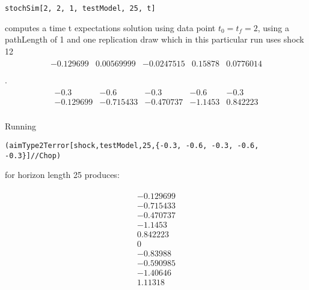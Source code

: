 \begin{verbatim}
stochSim[2, 2, 1, testModel, 25, t]
\end{verbatim}
computes a time t expectations solution  using data point $t_0=t_f=2$, using a pathLength of 1 and one replication draw 
which in this particular run uses
shock {12}
\begin{gather*}\begin{array}{ccccc}
 -0.129699 & 0.00569999 & -0.0247515 & 0.15878 & 0.0776014 \\
\end{array}
\end{gather*}
.
\begin{gather*}\begin{array}{ccccc}
 -0.3 & -0.6 & -0.3 & -0.6 & -0.3 \\
 -0.129699 & -0.715433 & -0.470737 & -1.1453 & 0.842223 \\
\end{array}
\end{gather*}







Running 
\begin{verbatim}
(aimType2Terror[shock,testModel,25,{-0.3, -0.6, -0.3, -0.6, -0.3}]//Chop)
\end{verbatim}
for horizon length 25 produces:





{\small
\begin{gather*}\begin{array}{c}
 -0.129699 \\
 -0.715433 \\
 -0.470737 \\
 -1.1453 \\
 0.842223 \\
 0 \\
 -0.83988 \\
 -0.590985 \\
 -1.40646 \\
 1.11318 \\
\end{array}
\end{gather*}
}




